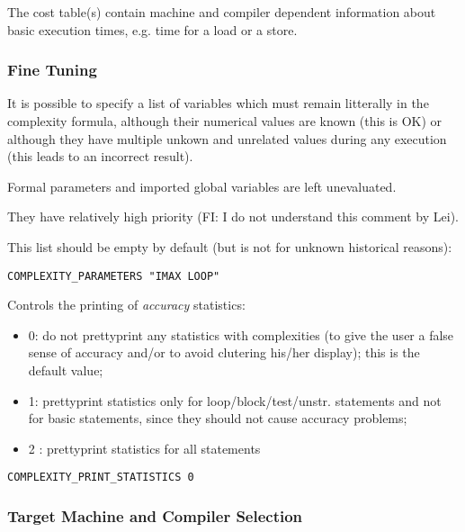 The cost table(s) contain machine and compiler dependent information
about basic execution times, e.g. time for a load or a store.

\subsubsection{Fine Tuning}

It is possible to specify a list of variables which must remain
litterally in the complexity formula, although their numerical values
are known (this is OK) or although they have multiple unkown and
unrelated values during any execution (this leads to an incorrect
result).

Formal parameters and imported global variables are left unevaluated.

They have relatively high priority (FI: I do not understand this comment
by Lei).

This list should be empty by default (but is not for unknown historical
reasons):

\begin{verbatim}
COMPLEXITY_PARAMETERS "IMAX LOOP"
\end{verbatim}

Controls the printing of {\em accuracy} statistics:

\begin{itemize}

  \item 0: do not prettyprint any statistics with complexities (to give
the user a false sense of accuracy and/or to avoid clutering his/her
display); this is the default value;

  \item 1: prettyprint statistics only for loop/block/test/unstr.
statements and not for basic statements, since they should not cause
accuracy problems;

  \item 2 : prettyprint statistics for all statements

\end{itemize}

\begin{verbatim}
COMPLEXITY_PRINT_STATISTICS 0
\end{verbatim}

\subsubsection{Target Machine and Compiler Selection}

